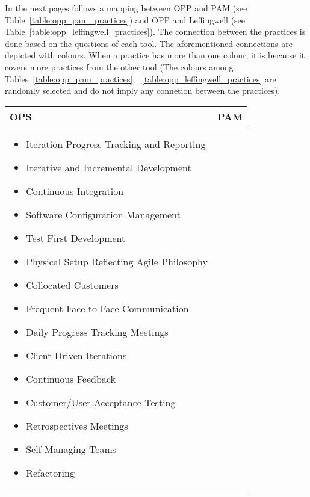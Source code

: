 In the next pages follows a mapping between OPP and PAM (see Table~\ref{table:opp_pam_practices}) and OPP and Leffingwell (see Table~\ref{table:opp_leffingwell_practices}). The connection between the practices is done based on the questions of each tool. The aforementioned connections are depicted with colours. When a practice has more than one colour, it is because it covers more practices from the other tool {\footnotesize (The colours among  Tables~\ref{table:opp_pam_practices}, ~\ref{table:opp_leffingwell_practices} are randomly selected and do not imply any connetion between the practices)}.



\begin{tabular}{| p{7.5cm} | p{7cm} |}
	\hline
	\textbf{OPS} & \textbf{PAM}  \\ \hline
     	\begin{itemize}
     		\item {\color{RoyalBlue1}Iteration Progress Tracking and Reporting}
     		\item {\color{RoyalBlue1}Iterative} {\color{DarkMagenta}and Incremental Development} 
     		\item {\color{DarkOrange1}Continuous Integration} 
     		\item {\color{DarkOrange1}Software Configuration Management} 
     		\item {\color{DarkOrange1}Test First} {\color{red2}Development} 
     		\item {\color{DeepPink1}Physical Setup Reflecting Agile Philosophy} 
     		\item {\color{DarkBlue}Collocated} {\color{DeepPink1}Customers}
     		\item {\color{DarkBlue}Frequent Face-to-Face} {\color{DeepPink1}Communication} 
     		\item {\color{green4}Daily Progress Tracking Meetings} 
     		\item {\color{DarkBlue}Client-Driven} {\color{RoyalBlue1}Iterations}
     		\item {\color{DarkBlue}Continuous Feedback} 
     		\item {\color{red2}Customer/User Acceptance Testing}
     		\item {\color{DarkRed}Retrospectives Meetings}
     		\item {\color{RoyalBlue1}Self-Managing Teams}
     		\item Refactoring
 		\end{itemize} 
 		& \begin{itemize}

\end{itemize}
\end{tabular}
